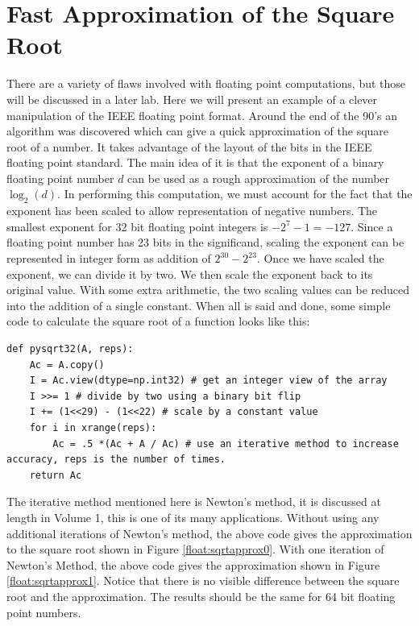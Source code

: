 \section*{Fast Approximation of the Square Root}
There are a variety of flaws involved with floating point computations, but those will be discussed in a later lab.
Here we will present an example of a clever manipulation of the IEEE floating point format.
Around the end of the 90's an algorithm was discovered which can give a quick approximation of the square root of a number.
It takes advantage of the layout of the bits in the IEEE floating point standard.
The main idea of it is that the exponent of a binary floating point number $d$ can be used as a rough approximation of the number $\log_2\left(d\right)$.
In performing this computation, we must account for the fact that the exponent has been scaled to allow representation of negative numbers.
The smallest exponent for 32 bit floating point integers is $-2^7 - 1 = -127$.
Since a floating point number has 23 bits in the significand, scaling the exponent can be represented in integer form as addition of $2^{30} - 2^{23}$.
Once we have scaled the exponent, we can divide it by two.
We then scale the exponent back to its original value.
With some extra arithmetic, the two scaling values can be reduced into the addition of a single constant.
When all is said and done, some simple code to calculate the square root of a function looks like this:
\begin{lstlisting}
def pysqrt32(A, reps):
    Ac = A.copy()
    I = Ac.view(dtype=np.int32) # get an integer view of the array
    I >>= 1 # divide by two using a binary bit flip
    I += (1<<29) - (1<<22) # scale by a constant value
    for i in xrange(reps):
        Ac = .5 *(Ac + A / Ac) # use an iterative method to increase accuracy, reps is the number of times.
    return Ac
\end{lstlisting}
The iterative method mentioned here is Newton's method, it is discussed at length in Volume 1, this is one of its many applications.
Without using any additional iterations of Newton's method, the above code gives the approximation to the square root shown in Figure \ref{float:sqrtapprox0}.
With one iteration of Newton's Method, the above code gives the approximation shown in Figure \ref{float:sqrtapprox1}.
Notice that there is no visible difference between the square root and the approximation.
The results should be the same for 64 bit floating point numbers.

